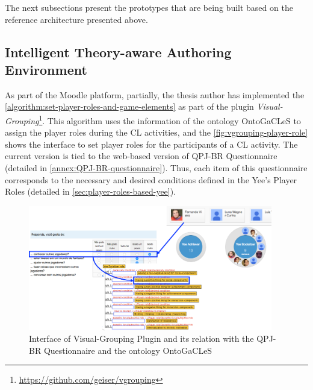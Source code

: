 The next subsections present the prototypes that are being built based on the reference architecture presented above.

\subsection[Intelligent Theory-aware Authoring Environment]{Intelligent Theory-aware Authoring Environment}
\label{subsec:autoring-moodle-platform}

As part of the Moodle platform, partially, the thesis author has implemented the \autoref{algorithm:set-player-roles-and-game-elements} as part of the plugin \emph{Visual-Grouping}\footnote{\url{https://github.com/geiser/vgrouping}}.
This algorithm uses the information of the ontology OntoGaCLeS to assign the player roles during the CL activities, and the \autoref{fig:vgrouping-player-role} shows the interface to set player roles for the participants of a CL activity.
The current version is tied to the web-based version of QPJ-BR Questionnaire \cite{AndradeMarquesBittencourtIsotani2016} (detailed in \autoref{annex:QPJ-BR-questionnaire}). Thus, each item of this questionnaire corresponds to the necessary and desired conditions defined in the Yee's Player Roles (detailed in \autoref{sec:player-roles-based-yee}).


 \begin{figure}[htb]
 \caption{Interface of Visual-Grouping Plugin and its relation with the QPJ-BR Questionnaire and the ontology OntoGaCLeS}
 \label{fig:vgrouping-player-role}
 \centering
 \includegraphics[width=0.95\textwidth]{images/chap-mechanisms-procedures/vgrouping-player-role.png}
 \fautor
 \end{figure}


